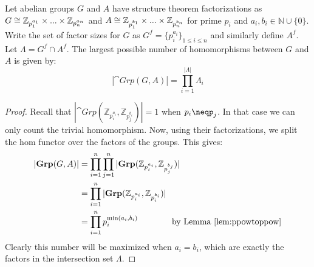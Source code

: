 \begin{lemma}
Let abelian groups $G$ and $A$ have structure theorem factorizations as $G\cong\mathbb{Z}_{p_1^{a_1}} \times ...\times\mathbb{Z}_{p_n^{a_n}}$ and $A\cong\mathbb{Z}_{p_1^{b_1}} \times ...\times\mathbb{Z}_{p_n^{b_n}}$ for prime $p_i$ and $a_i,b_i\in \mathbb{N}\cup\{0\}$. Write the set of factor sizes for $G$ as $G^f = \{p_i^{a_i}\}_{1\le i\le n}$ and similarly define $A^f$. Let $\Lambda = G^f\cap A^f$. The largest possible number of homomorphisms between $G$ and $A$ is given by:
\begin{equation}
|\cat{Grp}(G,A)| = \prod_{i=1}^{|\Lambda|}\Lambda_i
\end{equation}
\end{lemma}
\begin{proof}
Recall that $|\cat{Grp}\left(\mathbb{Z}_{p_i^{a_i}},\mathbb{Z}_{p_j^{b_i}}\right)|=1$ when $p_i\neqp_j$. In that case we can only count the trivial homomorphism. Now, using their factorizations, we split the hom functor over the factors of the groups. This gives:
\begin{align}
|\mathbf{Grp}(G,A)| &= \prod_{i=1}^n\prod_{j=1}^n|\mathbf{Grp}(\mathbb{Z}_{p_i^{a_i}},\mathbb{Z}_{p_j^{b_j}})|
\\ &= \prod_{i=1}^n|\mathbf{Grp}(\mathbb{Z}_{p_i^{a_i}},\mathbb{Z}_{p_i^{b_i}})|
\\ &= \prod_{i=1}^np_i^{\min(a_i,b_i)} \qquad \qquad \mbox{by Lemma \ref{lem:ppowtoppow}}
\end{align}
Clearly this number will be maximized when $a_i=b_i$, which are exactly the factors in the intersection set $\Lambda$.
\end{proof}

